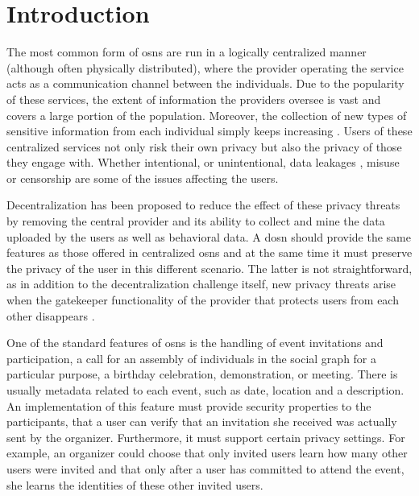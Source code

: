 
\begin{abstract}
    
\end{abstract}

\clearpage
\section{Introduction}
	\label{section:event-invitations-dosns:introduction}
The most common form of \Acp{osn} are run in a logically centralized manner (although 
often physically distributed), where the provider operating the service acts as 
a communication channel between the individuals. 
Due to the popularity of these services, the extent of information 
the providers oversee is vast and covers a large portion of the population. 
Moreover, the collection of new types of sensitive information from each individual 
simply keeps increasing \cite{Smith2014}.
%
Users of these centralized services not only risk their own privacy 
but also the privacy of those they engage with. 
Whether intentional, or unintentional, data leakages \cite{Shih2013}, 
misuse \cite{Lunden2012} or censorship are some of 
the issues affecting the users. 

Decentralization has been proposed to reduce the effect of these privacy threats
by removing the central provider and its ability to collect and 
mine the data uploaded by the users as well as behavioral data. A \Ac{dosn} should 
provide the same features as those offered in centralized \Acp{osn} and 
at the same time it must preserve the privacy of the user in this different 
scenario. The latter is not straightforward, 
as in addition to the decentralization challenge itself, new privacy threats 
arise when the gatekeeper functionality of the provider that protects users from each other 
disappears \cite{GreschbachKB12}.

One of the standard features of \Acp{osn} is the handling 
of event invitations and participation, \ie a call for an assembly of individuals 
in the social graph for a particular purpose, \eg a birthday celebration, demonstration, 
or meeting. There is usually metadata related to each event, such as date, 
location and a description.
An implementation of this feature must provide security properties to the participants, \eg
that a user can verify that an invitation she received was actually sent
by the organizer. Furthermore, it must support certain privacy settings.
For example, an organizer could choose that only invited users learn how
many other users were invited and that only after a user has committed
to attend the event, she learns the identities of these other invited
users.

